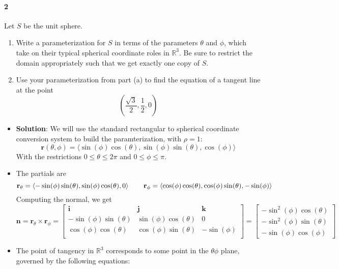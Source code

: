 \documentclass{article}
\begin{document}
    \newpage
    \paragraph{2} Let $S$ be the unit sphere.
    \begin{enumerate}[label=(\alph*)]
        \item Write a parameterization for $S$ in terms of the parameters $\theta$ and $\phi$, which take on their typical spherical coordinate roles in $\mathbb{R}^3$. Be sure to restrict the domain appropriately such that we get exactly one copy of $S$.
        \item Use your parameterization from part (a) to find the equation of a tangent line at the point
        \[ (\frac{\sqrt{3}}{2}, \frac{1}{2}, 0) \]
    \end{enumerate}
    \begin{itemize}
        \item \textbf{Solution}: We will use the standard rectangular to spherical coordinate conversion system to build the paramterization, with $\rho=1$:
        \[ \mathbf{r}(\theta, \phi) = \langle \sin(\phi)\cos(\theta), \sin(\phi)\sin(\theta), \cos(\phi) \rangle \]
        With the restrictions $0 \leq \theta \leq 2\pi$ and $0 \leq \phi \leq \pi$. 
        \item The partials are
        \[ \mathbf{r}_{\theta} = \langle -\sin(\phi)\sin(\theta), \sin(\phi)\cos(\theta), 0 \rangle \hspace{0.3in} \mathbf{r}_{\phi} = \langle \cos(\phi)\cos(\theta), \cos(\phi)\sin(\theta), -\sin(\phi) \rangle\]
        Computing the normal, we get
        \[
            \mathbf{n} = \mathbf{r}_{\theta} \times \mathbf{r}_{\phi} 
            = \begin{bmatrix} 
                \mathbf{i} & \mathbf{j} & \mathbf{k} \\
                -\sin(\phi)\sin(\theta) & \sin(\phi)\cos(\theta) & 0 \\
                \cos(\phi)\cos(\theta) & \cos(\phi)\sin(\theta) & -\sin(\phi) \\
            \end{bmatrix} =
            \begin{bmatrix}
                -\sin^2(\phi)\cos(\theta)\\
                -\sin^2(\phi)\sin(\theta)\\
                -\sin(\phi)\cos(\phi)
            \end{bmatrix}
        \]
        \item The point of tangency in $\mathbb{R}^3$ corresponds to some point in the $\theta\phi$ plane, governed by the following equations:

\end{itemize}
\end{document}
